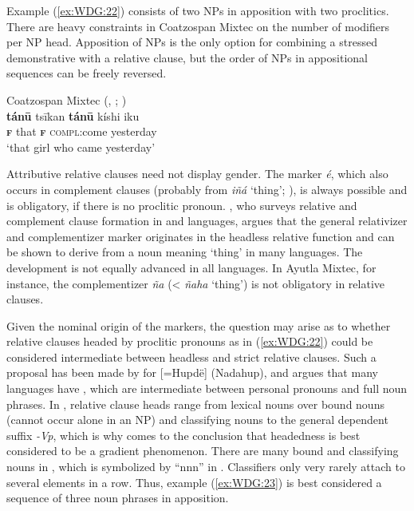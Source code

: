 \documentclass[output=collectionpaper]{langsci/langscibook}
\begin{document}
Example (\ref{ex:WDG:22}) consists of two NPs in apposition with two proclitics. There are heavy constraints in Coatzospan Mixtec on the number of modifiers per NP head. Apposition of NPs is the only option for combining a stressed demonstrative with a relative clause, but the order of NPs in appositional sequences can be freely reversed.

\ea\label{ex:WDG:22}
Coatzospan Mixtec (, ; \citealt[366]{Small1990})\\
\gll \textbf{tánū}	tsīkan	\textbf{tánū}	kíshi	iku\\
\textbf{\textsc{f}}	that	\textbf{\textsc{f}}	\textsc{compl}:come	yesterday\\
\glt `that girl who came yesterday'\\
\z

Attributive relative clauses need not display gender. The marker \textit{é}, which also occurs in complement clauses (probably from \textit{iñá} `thing'; \citealt{Hollenbach1995}), is always possible and is obligatory, if there is no proclitic pronoun. \cite{Hollenbach1995}, who surveys relative and complement clause formation in  and  languages, argues that the general relativizer and complementizer marker originates in the headless relative function and can be shown to derive from a noun meaning `thing' in many  languages. The development is not equally advanced in all  languages. In Ayutla Mixtec, for instance, the complementizer \textit{ña} (< \textit{ñaha} `thing') is not obligatory in relative clauses.

Given the nominal origin of the markers, the question may arise as to whether relative clauses headed by proclitic pronouns as in (\ref{ex:WDG:22}) could be considered intermediate between headless and strict relative clauses. Such a proposal has been made by \cite{Epps2012} for  [=Hupdë] (Nadahup), and  argues that many languages have , which are intermediate between personal pronouns and full noun phrases. In , relative clause heads range from lexical nouns over bound nouns (cannot occur alone in an NP) and classifying nouns to the general dependent suffix \textit{-Vp}, which is why \cite{Epps2012} comes to the conclusion that headedness is best considered to be a gradient phenomenon. There are many bound and classifying nouns in , which is symbolized by ``nnn'' in . Classifiers only very rarely attach to several elements in a row. Thus, example (\ref{ex:WDG:23}) is best considered a sequence of three noun phrases in apposition.
\end{document}
